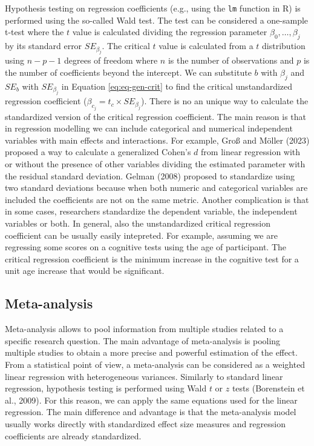 \documentclass[
  man]{apa7}
\begin{document}
Hypothesis testing on regression coefficients (e.g., using the \texttt{lm} function in R) is performed using the so-called Wald test. The test can be considered a one-sample t-test where the \(t\) value is calculated dividing the regression parameter \(\beta_0, \dots, \beta_j\) by its standard error \(SE_{\beta_j}\). The critical \(t\) value is calculated from a \(t\) distribution using \(n - p - 1\) degrees of freedom where \(n\) is the number of observations and \(p\) is the number of coefficients beyond the intercept. We can substitute \(b\) with \(\beta_j\) and \(SE_{b}\) with \(SE_{\beta_j}\) in Equation \eqref{eq:eq-gen-crit} to find the critical unstandardized regression coefficient (\(\beta_{c_j} = t_c \times SE_{\beta_j}\)). There is no an unique way to calculate the standardized version of the critical regression coefficient. The main reason is that in regression modelling we can include categorical and numerical independent variables with main effects and interactions. For example, Groß and Möller (2023) proposed a way to calculate a generalized Cohen's \(d\) from linear regression with or without the presence of other variables dividing the estimated parameter with the residual standard deviation. Gelman (2008) proposed to standardize using two standard deviations because when both numeric and categorical variables are included the coefficients are not on the same metric. Another complication is that in some cases, researchers standardize the dependent variable, the independent variables or both. In general, also the unstandardized critical regression coefficient can be usually easily intepreted. For example, assuming we are regressing some scores on a cognitive tests using the age of participant. The critical regression coefficient is the minimum increase in the cognitive test for a unit age increase that would be significant.

\hypertarget{meta-analysis}{%
\subsection{Meta-analysis}\label{meta-analysis}}

Meta-analysis allows to pool information from multiple studies related to a specific research question. The main advantage of meta-analysis is pooling multiple studies to obtain a more precise and powerful estimation of the effect. From a statistical point of view, a meta-analysis can be considered as a weighted linear regression with heterogeneous variances. Similarly to standard linear regression, hypothesis testing is performed using Wald \(t\) or \(z\) tests (Borenstein et al., 2009). For this reason, we can apply the same equations used for the linear regression. The main difference and advantage is that the meta-analysis model usually works directly with standardized effect size measures and regression coefficients are already standardized.
\end{document}
